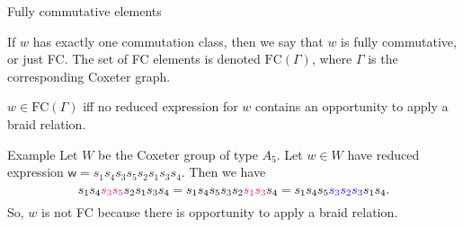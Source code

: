 \documentclass[9pt,handout]{beamer}
\newcommand{\w}{{\textsf{w}}}
\newcommand{\FC}{\mathrm{FC}}
\begin{document}
\begin{frame}{Fully commutative elements}
\begin{definition} If $w$ has exactly one commutation class, then we say that $w$ is \alert{fully commutative}, or just \alert{FC}. The set of FC elements is denoted $\FC(\Gamma)$, where $\Gamma$ is the corresponding Coxeter graph.
\end{definition}

\pause

\begin{theorem}[Stembridge]
$w \in \FC(\Gamma)$ iff no reduced expression for $w$ contains an opportunity to apply a braid relation.
\end{theorem}

\pause

\begin{block}{Example} Let $W$ be the Coxeter group of type $A_5$. Let $w \in W$ have reduced expression $\w = s_1 s_4 s_3 s_5 s_2 s_1 s_3 s_4$. Then we have 
    $$s_1 s_4 \textcolor{magenta}{s_3 s_5} s_2 s_1 s_3 s_4 = s_1 s_4 s_5 s_3 s_2 \textcolor{magenta}{s_1 s_3} s_4 = s_1 s_4 s_5 \textcolor{blue}{s_3 s_2 s_3} s_1 s_4.$$
    So, $w$ is not FC because there is opportunity to apply a braid relation.
\end{block}
\end{frame}


%
\end{document}
